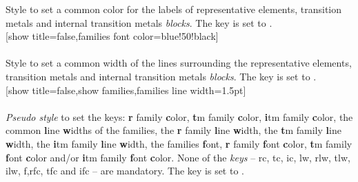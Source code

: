 \label{style_families_font_color}%
%
{Style to set a common color for the labels of representative elements, transition metals and internal transition metals \textit{blocks}. The key  is set to .
}%
\\ [5pt][show title=false,families font color=blue!50!black]%
\\ [5pt]\makebox[\linewidth][c]{\scalebox{.6}{\pgfPT[show title=false,families font color=blue!50!black]}}%
\\ [0pt]\pgfPTendstyle%
\label{style_families line width}%
%
{Style to set a common width of the lines surrounding the representative elements, transition metals and internal transition metals \textit{blocks}.
The key  is set to .
}%
\\ [5pt][show title=false,show families,families line width=1.5pt]%
\\ [5pt]\makebox[\linewidth][c]{\scalebox{.6}{\pgfPT[show title=false,show families,families line width=1.5pt]}}%
\\ [0pt]\pgfPTendstyle%
\label{style_families}%
%
{\textit{Pseudo style} to set the keys: \textbf{r} family \textbf{c}olor, \textbf{t}m family \textbf{c}olor, \textbf{i}tm family \textbf{c}olor, the common \textbf{l}ine \textbf{w}idths of the families, the \textbf{r} family \textbf{l}ine \textbf{w}idth, the \textbf{t}m family \textbf{l}ine \textbf{w}idth, the \textbf{i}tm family \textbf{l}ine \textbf{w}idth, the families \textbf{f}ont, \textbf{r} family \textbf{f}ont \textbf{c}olor, \textbf{t}m family \textbf{f}ont \textbf{c}olor and/or \textbf{i}tm family \textbf{f}ont \textbf{c}olor. None of the \textit{keys} -- rc, tc, ic, lw, rlw, tlw, ilw, f,rfc, tfc and ifc -- are mandatory.
The key  is set to .
\\ [5pt]
\\ [5pt]%
}%
